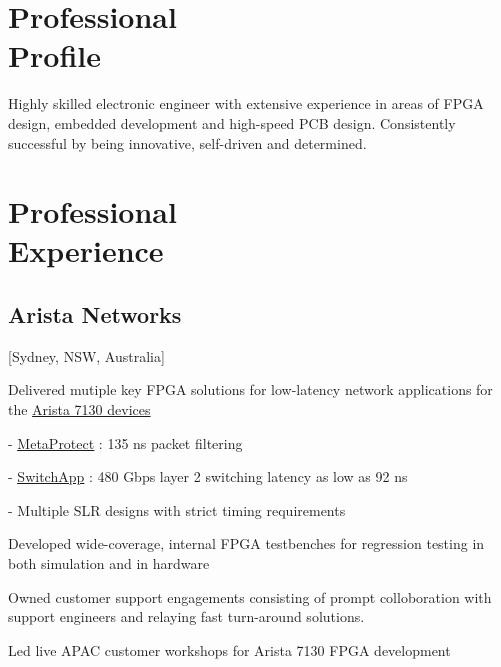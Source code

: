 \documentclass{mycv}
\begin{document}
\newcommand{\SubItem}[1]{
    {\setlength\itemindent{15pt} \item[-] #1}
}

\maketitle%

\section{Professional \\ Profile}

Highly skilled electronic engineer with extensive experience in areas of FPGA design, embedded development and high-speed PCB design. 
Consistently successful by being innovative, self-driven and determined.

\section{Professional \\ Experience}

\subsection{Arista Networks}[Sydney, NSW, Australia]
\begin{positions}
\end{positions}

\begin{itemize}[noitemsep]
  \item Delivered mutiple key FPGA solutions for low-latency network applications for the \href{https://www.arista.com/en/products/7130-network-applications-quick-look}{Arista 7130 devices}
    \SubItem{\href{https://www.arista.com/assets/data/pdf/ProductBrief-MetaProtect-Firewall.pdf}{\underline{MetaProtect}} : 135 ns packet filtering}
    \SubItem{\href{https://www.arista.com/assets/data/pdf/ProductBrief-SwitchApp.pdf}{\underline{SwitchApp}} : 480 Gbps layer 2 switching latency as low as 92 ns}
    \SubItem{Multiple SLR designs with strict timing requirements}
  \item Developed wide-coverage, internal FPGA testbenches for regression testing in both simulation and in hardware
  \item Owned customer support engagements consisting of prompt colloboration with support engineers and relaying fast turn-around solutions.
  \item Led live APAC customer workshops for Arista 7130 FPGA development
\end{itemize}
\end{document}
